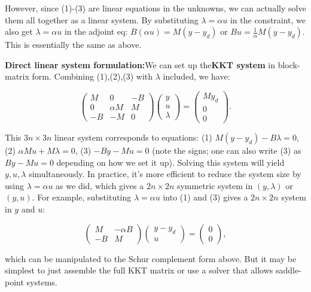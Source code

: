 However, since (1)-(3) are linear equations in the unknowns, we can actually solve them all together as a linear system. By substituting \(\lambda=\alpha u\) in the constraint, we also get \(\lambda = \alpha u\) in the adjoint eq: \(B(\alpha u) = M(y - y_d)\) or \(B u = \frac{1}{\alpha}M(y - y_d)\). This is essentially the same as above.

\textbf{Direct linear system formulation:}We can set up the\textbf{KKT system} in block-matrix form. Combining (1),(2),(3) with \(\lambda\) included, we have:

\[
	\begin{pmatrix}
		M  & 0        & -B \\
		0  & \alpha M & M  \\
		-B & -M       & 0
	\end{pmatrix}
	\begin{pmatrix} y \\ u \\ \lambda \end{pmatrix}
	=
	\begin{pmatrix} M y_d \\ 0 \\ 0 \end{pmatrix}.
\]

This \(3n \times 3n\) linear system corresponds to equations:
(1) \(M(y - y_d) - B\lambda = 0\),
(2) \(\alpha M u + M \lambda = 0\),
(3) \(-B y - M u = 0\) (note the signs; one can also write (3) as \(B y - M u = 0\) depending on how we set it up). Solving this system will yield \(y, u, \lambda\) simultaneously.
In practice, it's more efficient to reduce the system size by using \(\lambda = \alpha u\) as we did, which gives a \(2n \times 2n\) symmetric system in \((y,\lambda)\) or \((y,u)\). For example, substituting \(\lambda=\alpha u\) into (1) and (3) gives a \(2n\times 2n\) system in \(y\) and \(u\):

\[
	\begin{pmatrix}
		M  & -\alpha B \\
		-B & M
	\end{pmatrix}
	\begin{pmatrix} y - y_d \\ u \end{pmatrix}
	= \begin{pmatrix} 0 \\ 0 \end{pmatrix},
\]

which can be manipulated to the Schur complement form above. But it may be simplest to just assemble the full KKT matrix or use a solver that allows saddle-point systems.

